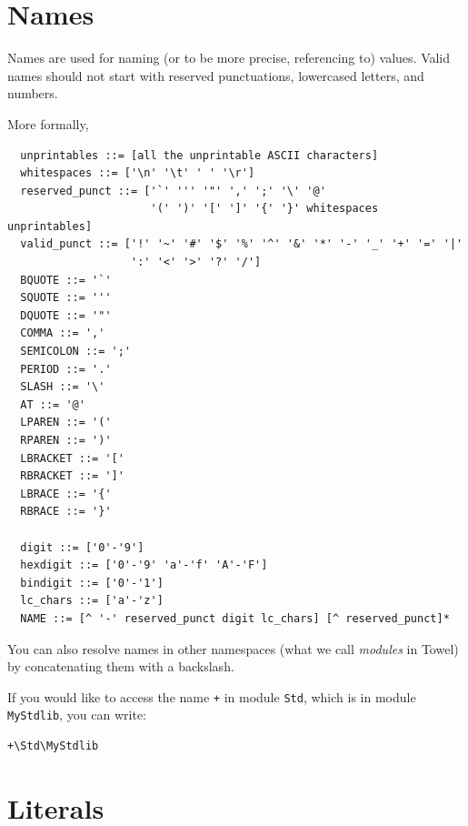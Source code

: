\documentclass{report}
\begin{document}
\section{Names}

Names are used for naming (or to be more precise, referencing to) values. Valid names should not start with reserved punctuations, lowercased letters, and numbers.

More formally,
\begin{verbatim}
  unprintables ::= [all the unprintable ASCII characters]
  whitespaces ::= ['\n' '\t' ' ' '\r']
  reserved_punct ::= ['`' ''' '"' ',' ';' '\' '@' 
                      '(' ')' '[' ']' '{' '}' whitespaces unprintables]
  valid_punct ::= ['!' '~' '#' '$' '%' '^' '&' '*' '-' '_' '+' '=' '|'
                   ':' '<' '>' '?' '/']
  BQUOTE ::= '`'
  SQUOTE ::= '''
  DQUOTE ::= '"'
  COMMA ::= ','
  SEMICOLON ::= ';'
  PERIOD ::= '.'
  SLASH ::= '\'
  AT ::= '@'
  LPAREN ::= '('
  RPAREN ::= ')'
  LBRACKET ::= '['
  RBRACKET ::= ']'
  LBRACE ::= '{'
  RBRACE ::= '}'

  digit ::= ['0'-'9']
  hexdigit ::= ['0'-'9' 'a'-'f' 'A'-'F']
  bindigit ::= ['0'-'1']
  lc_chars ::= ['a'-'z']
  NAME ::= [^ '-' reserved_punct digit lc_chars] [^ reserved_punct]*
\end{verbatim}

You can also resolve names in other namespaces (what we call \textit{modules} in Towel) by concatenating them with a backslash.

\begin{mdframed}[style=example]
If you would like to access the name \texttt{+} in module \texttt{Std}, which is in module \texttt{MyStdlib}, you can write:

\begin{verbatim}
+\Std\MyStdlib
\end{verbatim}

\end{mdframed}

\section{Literals}
\end{document}
